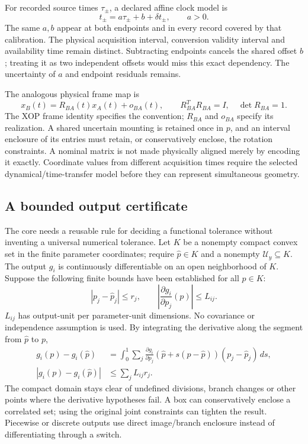 For recorded source times $\tau_\pm$, a declared affine clock model is
\begin{equation}
 t_\pm=a\tau_\pm+b+\delta t_\pm,\qquad a>0.
 \label{r13-measurement-clock}
\end{equation}
The same $a,b$ appear at both endpoints and in every record covered by that
calibration. The physical acquisition interval, conversion validity interval
and availability time remain distinct. Subtracting endpoints cancels the
shared offset $b$; treating it as two independent offsets would miss this
exact dependency. The uncertainty of $a$ and endpoint residuals remains.

The analogous physical frame map is
\begin{equation}
 x_B(t)=R_{BA}(t)x_A(t)+o_{BA}(t),\qquad
 R_{BA}^TR_{BA}=I,\quad\det R_{BA}=1.
 \label{r13-measurement-frame}
\end{equation}
The XOP frame identity specifies the convention; $R_{BA}$ and $o_{BA}$
specify its realization. A shared uncertain mounting is retained once in
$p$, and an interval enclosure of its entries must retain, or conservatively
enclose, the rotation constraints. A nominal matrix is not made physically
aligned merely by encoding it exactly. Coordinate values from different
acquisition times require the selected dynamical/time-transfer model before
they can represent simultaneous geometry.

\subsection{A bounded output certificate}
\label{r13-measurement-certificate}

The core needs a reusable rule for deciding a functional tolerance without
inventing a universal numerical tolerance. Let $K$ be a nonempty compact
convex set in the finite parameter coordinates; require
$\widehat p\in K$ and a nonempty $\mathcal U_y\subseteq K$. The output
$g_i$ is continuously differentiable on an open neighborhood of $K$. Suppose
the following finite bounds have been established for all $p\in K$:
\begin{equation}
 |p_j-\widehat p_j|\leq r_j,\qquad
 \left|\frac{\partial g_i}{\partial p_j}(p)\right|\leq L_{ij}.
 \label{r13-measurement-lipschitz-data}
\end{equation}
$L_{ij}$ has output-unit per parameter-unit dimensions. No covariance or
independence assumption is used. By integrating the derivative along the
segment from $\widehat p$ to $p$,
\begin{align}
 g_i(p)-g_i(\widehat p)
 &=\int_0^1\sum_j
   \frac{\partial g_i}{\partial p_j}
   (\widehat p+s(p-\widehat p))(p_j-\widehat p_j)\,ds,\\
 |g_i(p)-g_i(\widehat p)|&\leq\sum_jL_{ij}r_j.
 \label{r13-measurement-meanvalue}
\end{align}
The compact domain stays clear of undefined divisions, branch changes or
other points where the derivative hypotheses fail. A box can conservatively
enclose a correlated set; using the original joint constraints can tighten
the result. Piecewise or discrete outputs use direct image/branch enclosure
instead of differentiating through a switch.

